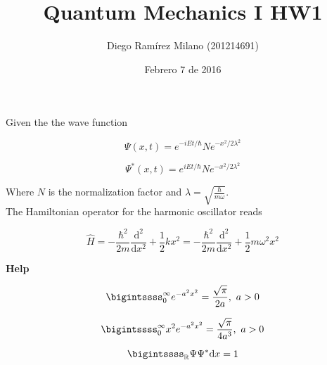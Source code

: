 \documentclass[11pt,letterpaper]{article}%
\title{\textbf{Quantum Mechanics I HW1}}
\author{Diego Ramírez Milano (201214691)}
\date{Febrero 7 de 2016}
\newcommand{\dx}{\mathrm{d}x}
\begin{document}
\maketitle

Given the the wave function

\begin{equation}
\label{wavefunc}
\Psi(x,t) = e^{-iEt/\hbar}Ne^{-x^2/2\lambda^2}
\end{equation}

\begin{equation}
\label{wavefunc*}
\Psi^*(x,t) = e^{iEt/\hbar}Ne^{-x^2/2\lambda^2}
\end{equation}

Where $N$ is the normalization factor and $\lambda = \sqrt{\frac{\hbar}{m\omega}}$.\\The Hamiltonian operator for the harmonic oscillator reads

\begin{equation}
\label{hamil}
\hat{H} = -\frac{\hbar^2}{2m}\frac{\mathrm{d}^2}{\mathrm{d}x^2} + \frac{1}{2}kx^2 = -\frac{\hbar^2}{2m}\frac{\mathrm{d}^2}{\mathrm{d}x^2} + \frac{1}{2}m\omega^2x^2
\end{equation}

\textbf{Help}

\begin{equation}
\label{help1}
\bigintssss_0^{\infty}e^{-a^2x^2} = \frac{\sqrt{\pi}}{2a},\ a>0
\end{equation}

\begin{equation}
\label{help2}
\bigintssss_0^{\infty}x^2e^{-a^2x^2} = \frac{\sqrt{\pi}}{4a^3},\ a>0
\end{equation}

\begin{equation}
\label{prob}
\bigintssss_{\mathbb{R}}\Psi\Psi^*\dx = 1
\end{equation}
\end{document}
